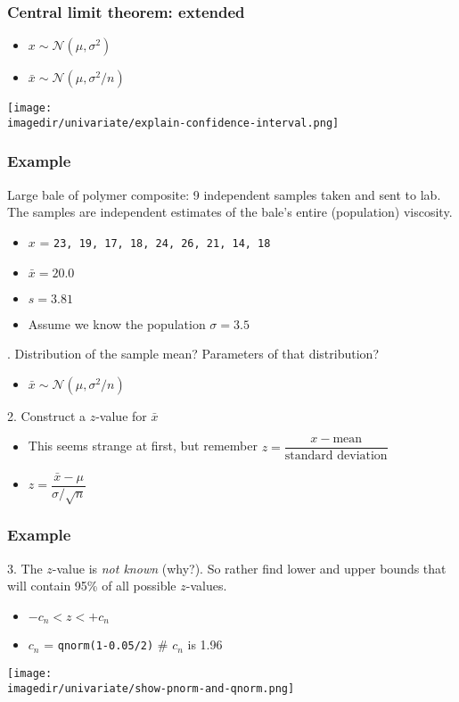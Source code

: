 \begin{frame}\frametitle{Central limit theorem: extended}
	\begin{itemize}
		\item	$x \sim \mathcal{N}\left(\mu, \sigma^2 \right)$
		\item	$\bar{x} \sim \mathcal{N}\left(\mu, \sigma^2/n \right)$
	\end{itemize}
	\texttt{[image: \\imagedir/univariate/explain-confidence-interval.png]}
\end{frame}

\begin{frame}\frametitle{Example}

	Large bale of polymer composite: 9 independent samples taken and sent to lab. The samples are independent estimates of the bale's entire (population) viscosity.
	\begin{itemize}
		\item	$x$ = \texttt{23, 19, 17, 18, 24, 26, 21, 14, 18}
		\item	$\bar{x} = 20.0$
		\item	$s=3.81$
		\item	Assume we know the population $\sigma=3.5$
	\end{itemize}
	. Distribution of the sample mean? Parameters of that distribution?
	\begin{itemize}
		\item$\bar{x} \sim \mathcal{N}\left(\mu, \sigma^2/n \right)$
	\end{itemize}
	2. Construct a $z$-value for $\bar{x} $
	\begin{itemize}
		\item	This seems strange at first, but remember $z = \dfrac{x - \text{mean}}{\text{standard deviation}}$
		\item	$z = \dfrac{\bar{x} -\mu}{\sigma/\sqrt{n}}$
	\end{itemize}
\end{frame}

\begin{frame}\frametitle{Example}
	3. The $z$-value is \emph{not known} (why?). So rather find lower and upper bounds that will contain 95\% of all possible $z$-values.
	\begin{itemize}
		\item	$-c_n < z < +c_n$
		\item	$c_n$ = \texttt{qnorm(1-0.05/2)}       \qquad\# $c_n$ is 1.96
	\end{itemize}
	\begin{center}
		\texttt{[image: \\imagedir/univariate/show-pnorm-and-qnorm.png]}
	\end{center}
\end{frame}

